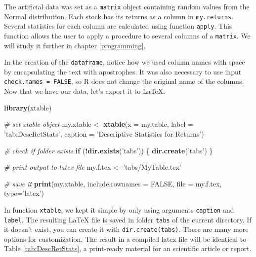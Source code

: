 \documentclass[11pt,]{book}
\newenvironment{Shaded}{\begin{snugshade}}{\end{snugshade}}
\newcommand{\KeywordTok}[1]{\textcolor[rgb]{0.27,0.27,0.27}{\textbf{#1}}}
\newcommand{\DataTypeTok}[1]{\textcolor[rgb]{0.27,0.27,0.27}{#1}}
\newcommand{\StringTok}[1]{\textcolor[rgb]{0.5,0.5,0.5}{#1}}
\newcommand{\CommentTok}[1]{\textcolor[rgb]{0.56,0.35,0.01}{\textit{#1}}}
\newcommand{\OtherTok}[1]{\textcolor[rgb]{0.56,0.35,0.01}{#1}}
\newcommand{\ControlFlowTok}[1]{\textcolor[rgb]{0.13,0.29,0.53}{\textbf{#1}}}
\newcommand{\OperatorTok}[1]{\textcolor[rgb]{0.81,0.36,0.00}{\textbf{#1}}}
\newcommand{\NormalTok}[1]{#1}
\begin{document}
The artificial data was set as a \texttt{matrix} object containing
random values from the Normal distribution. Each stock has its returns
as a column in \texttt{my.returns}. Several statistics for each column
are calculated using function \texttt{apply}. This function allows the
user to apply a procedure to several columns of a \texttt{matrix}. We
will study it further in chapter \ref{programming}.

In the creation of the \texttt{dataframe}, notice how we used column
names with space by encapsulating the text with apostrophes. It was also
necessary to use input \texttt{check.names\ =\ FALSE}, so R does not
change the original name of the columns. Now that we have our data,
let's export it to LaTeX.

\begin{Shaded}
\begin{Highlighting}[]
\KeywordTok{library}\NormalTok{(xtable)}

\CommentTok{# set xtable object}
\NormalTok{my.xtable <-}\StringTok{ }\KeywordTok{xtable}\NormalTok{(}\DataTypeTok{x =}\NormalTok{ my.table, }
                    \DataTypeTok{label =} \StringTok{'tab:DescRetStats'}\NormalTok{,}
                    \DataTypeTok{caption =} \StringTok{'Descriptive Statistics for Returns'}\NormalTok{)}

\CommentTok{# check if folder exists}
\ControlFlowTok{if}\NormalTok{ (}\OperatorTok{!}\KeywordTok{dir.exists}\NormalTok{(}\StringTok{'tabs'}\NormalTok{)) \{ }
    \KeywordTok{dir.create}\NormalTok{(}\StringTok{'tabs'}\NormalTok{)}
\NormalTok{\}}

\CommentTok{# print output to latex file}
\NormalTok{my.f.tex <-}\StringTok{ 'tabs/MyTable.tex'}

\CommentTok{# save it}
\KeywordTok{print}\NormalTok{(my.xtable,}
      \DataTypeTok{include.rownames =} \OtherTok{FALSE}\NormalTok{,}
      \DataTypeTok{file =}\NormalTok{ my.f.tex,}
      \DataTypeTok{type=}\StringTok{'latex'}\NormalTok{)}
\end{Highlighting}
\end{Shaded}

In function \texttt{xtable}, we kept it simple by only using arguments
\texttt{caption} and \texttt{label}. The resulting LaTeX file is saved
in folder \texttt{tabs} of the current directory. If it doesn't exist,
you can create it with
\texttt{dir.create(\textquotesingle{}tabs\textquotesingle{})}. There are
many more options for customization. The result in a compiled latex file
will be identical to Table \ref{tab:DescRetStats}, a print-ready
material for an scientific article or report.
\end{document}
